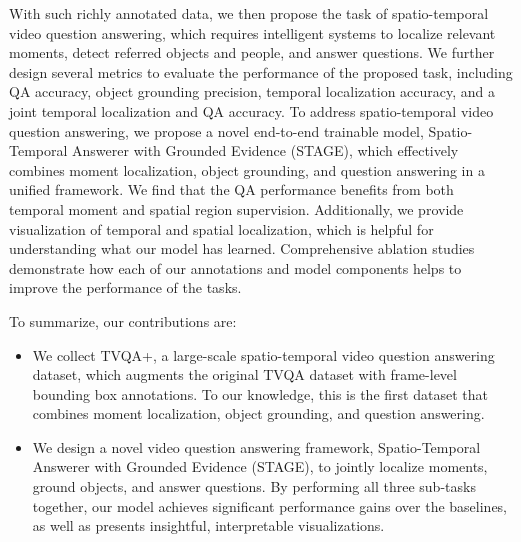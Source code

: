 \documentclass[11pt,a4paper]{article}
\begin{document}
With such richly annotated data, we then propose the task of spatio-temporal video question answering, which requires intelligent systems to localize relevant moments, detect referred objects and people, and answer questions. 
We further design several metrics to evaluate the performance of the proposed task, including QA accuracy, object grounding precision, temporal localization accuracy, and a joint temporal localization and QA accuracy.
To address spatio-temporal video question answering, we propose a novel end-to-end trainable model, Spatio-Temporal Answerer with Grounded Evidence (STAGE), 
which effectively combines moment localization, object grounding, and question answering in a unified framework.
We find that the QA performance benefits from both temporal moment and spatial region supervision. 
Additionally, we provide visualization of temporal and spatial localization, which is helpful for understanding what our model has learned.
Comprehensive ablation studies demonstrate how each of our annotations and model components helps to improve the performance of the tasks. 

\smallskip
\noindent To summarize, our contributions are:
\begin{itemize}[leftmargin=*]
    \item We collect TVQA+, 
    a large-scale spatio-temporal video question answering dataset, which augments the original TVQA dataset with frame-level bounding box annotations. To our knowledge, this is the first dataset that combines moment localization, object grounding, and question answering. 
    \item We design a novel video question answering framework, Spatio-Temporal Answerer with Grounded Evidence (STAGE),  to jointly localize moments, ground objects, and answer questions. By performing all three sub-tasks together, our model achieves significant performance gains over the baselines, as well as presents insightful, interpretable visualizations.
\end{itemize}
\end{document}
